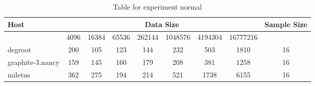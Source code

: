 \begin{table}
\caption{Table for experiment normal}
\begin{tabular}{@{}lcccccccc@{}}
\toprule
Host    & \multicolumn{7}{c}{Data Size}          & Sample Size \\ \midrule
& 4096  & 16384  & 65536  & 262144  & 1048576  & 4194304  & 16777216              \\ \midrule
degroot  & 200  & 105  & 123  & 144  & 232  & 503  & 1810  & 16 \\
graphite-3.nancy  & 159  & 145  & 160  & 179  & 208  & 381  & 1258  & 16 \\
miletus  & 362  & 275  & 194  & 214  & 521  & 1738  & 6155  & 16 \\
\bottomrule
\end{tabular}
\end{table}